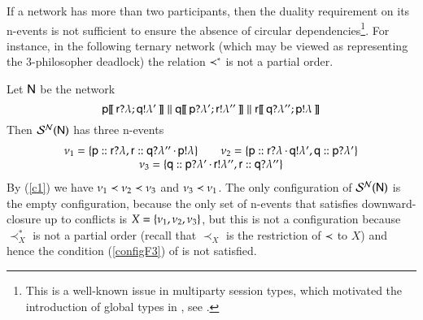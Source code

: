 If  a network  %
has more than two participants, then the
duality requirement on its  n-events  is not sufficient to ensure the
absence of circular dependencies\footnote{This is a well-known issue
  in multiparty session types, which motivated the introduction of
  global types in \cite{CHY08}, see .}.  For
instance, in the following ternary network (which may be viewed as
representing the 3-philosopher deadlock) the relation $\prec^*$ is
not a partial order.
%
\begin{example}
Let ${\sf N}$ be the network 
\[
{\sf p}[\![\,{\sf r}?\lambda;{\sf q}!\lambda'\,]\!] \mathrel{\|}
{\sf q}[\![\,{\sf p}?\lambda';{\sf r}!\lambda''\,]\!] \mathrel{\|}
{\sf r}[\![\,{\sf q}?\lambda'';{\sf p}!\lambda\,]\!]
\]
Then  $\mathcal{S}^{\mathcal{N}}({\sf N})$  has three  n-events
\[
\begin{array}{c}
\nu_1 = \{{\sf p}:: {\sf r}?\lambda,{\sf r}:: {{\sf q}?\lambda''}\,{\cdot}\,{\sf p}!\lambda\}\qquad
\nu_2 =
\{{\sf p}:: {{\sf r}?\lambda}\,{\cdot}\,{\sf q}!\lambda',
{\sf q}:: {\sf p}?\lambda'\}\\
\nu_3 = \{{\sf q}:: {{\sf p}?\lambda'}\,{\cdot}\,{\sf r}!\lambda'',{\sf r}:: {\sf q}?\lambda''\}
\end{array}
\]
By (\ref{c1}) 
we have
$\nu_1 \prec \nu_2 \prec \nu_3$ and  $\nu_3 \prec \nu_1$.
The only configuration of  $\mathcal{S}^{\mathcal{N}}({\sf N})$  is the empty
configuration, because the only set of n-events that satisfies
downward-closure up to conflicts
is $X =\{\nu_1, \nu_2, \nu_3\}$, 
but this is not a configuration because 
$\prec_X^*$ is not  a partial order (recall that $\prec_X$ is the
restriction of $\prec$ to $X$) and hence the condition (\ref{configF3}) of
 is not satisfied. 
\end{example}